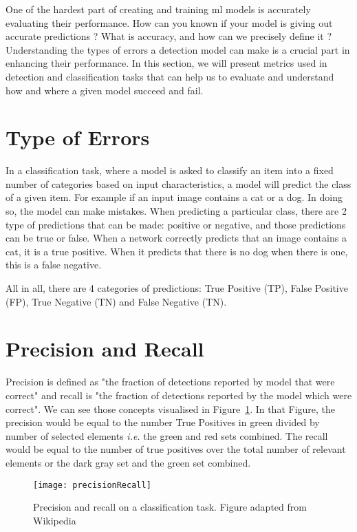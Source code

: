 One of the hardest part of creating and training \gls{ml} models is accurately evaluating their performance. How can you known if your model is giving out accurate predictions ? What is accuracy, and how can we precisely define it ? Understanding the types of errors a detection model can make is a crucial part in enhancing their performance. In this section, we will present metrics used in detection and classification tasks that can help us to evaluate and understand how and where a given model succeed and fail.

\section{Type of Errors}
In a classification task, where a model is asked to classify an item into a fixed number of categories based on input characteristics, a model will predict the class of a given item. For example if an input image contains a cat or a dog. In doing so, the model can make mistakes. When predicting a particular class, there are 2 type of predictions that can be made: positive or negative, and those predictions can be true or false. When a network correctly predicts that an image contains a cat, it is a true positive. When it predicts that there is no dog when there is one, this is a false negative.

All in all, there are 4 categories of predictions: True Positive (TP), False Positive (FP), True Negative (TN) and False Negative (TN). 

\section{Precision and Recall}
Precision is defined as "the fraction of detections reported by model that were correct" and recall is "the fraction of detections reported by the model which were correct"\cite[p.411]{Goodfellow2016}. We can see those concepts visualised in Figure~\ref{fig:precRecall}. In that Figure, the precision would be equal to the number True Positives in green divided by number of selected elements \textit{i.e.} the green and red sets combined. The recall would be equal to the number of true positives over the total number of relevant elements or the dark gray set and the green set combined. 

\begin{figure}[h]
  \centering
  \texttt{[image: precisionRecall]}
	\caption[]{Precision and recall on a classification task. Figure adapted from Wikipedia\cite{precRecall}}
  \label{fig:precRecall}
\end{figure}


